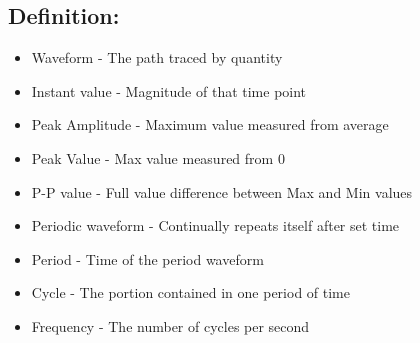 \documentclass[a5paper]{article}
\begin{document}
	\subsection{Definition:}
	\begin{itemize}
		\item Waveform - The path traced by quantity
		\item Instant value - Magnitude of that time point
		\item Peak Amplitude - Maximum value measured from average
		\item Peak Value - Max value measured from 0
		\item P-P value - Full value difference between Max and Min values
		\item Periodic waveform - Continually repeats itself after set time
		\item Period - Time of the period waveform
		\item Cycle - The portion contained in one period of time
		\item Frequency - The number of cycles per second
	\end{itemize}
\end{document}
